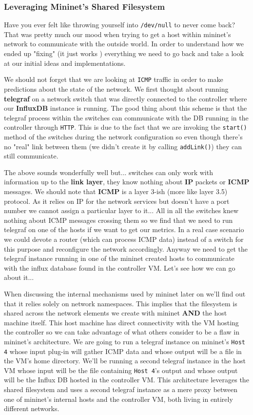 \documentclass[12pt]{report}
\newcommand{\newpar} {
    \vskip 1cm
}
\begin{document}
			\subsubsection{Leveraging Mininet's Shared Filesystem}
				Have you ever felt like throwing yourself into \texttt{/dev/null} to never come back? That was pretty much our mood when trying to get a host within mininet's network to communicate with the outside world. In order to understand how we ended up "fixing" (it just works  ) everything we need to go back and take a look at our initial ideas and implementations.
				\newpar
				We should not forget that we are looking at \texttt{ICMP} traffic in order to make predictions about the state of the network. We first thought about running \textbf{telegraf} on a network switch that was directly connected to the controller where our \textbf{InfluxDB} instance is running. The good thing about this scheme is that the telegraf process within the switches can communicate with the DB running in the controller through \texttt{HTTP}. This is due to the fact that we are invoking the \texttt{start()} method of the switches during the network configuration so even though there's no "real" link between them (we didn't create it by calling \texttt{addLink()}) they can still communicate.
				\newpar
				The above sounds wonderfully well but... switches can only work with information up to the \textbf{link layer}, they know nothing about \textbf{IP} packets or \textbf{ICMP} messages. We should note that \textbf{ICMP} is a layer 3-ish (more like layer 3.5) protocol. As it relies on IP for the network services but doesn't have a port number we cannot assign a particular layer to it... All in all the switches knew nothing about ICMP messages crossing them so we find that we need to run telegraf on one of the hosts if we want to get our metrics. In a real case scenario we could devote a router (which can process ICMP data) instead of a switch for this purpose and reconfigure the network accordingly. Anyway we need to get the telegraf instance running in one of the mininet created hosts to communicate with the influx database found in the controller VM. Let's see how we can go about it...
				\newpar
				When discussing the internal mechanisms used by mininet later on we'll find out that it relies solely on network namespaces. This implies that the filesystem is shared across the network elements we create with mininet \textbf{AND} the host machine itself. This host machine has direct connectivity with the VM hosting the controller so we can take advantage of what others consider to be a flaw in mininet's architecture. We are going to run a telegraf instance on mininet's \texttt{Host 4} whose input plug-in will gather ICMP data and whose output will be a file in the VM's home directory. We'll be running a second telegraf instance in the host VM whose input will be the file containing \texttt{Host 4}'s output and whose output will be the Influx DB hosted in the controller VM. This architecture leverages the shared filesystem and uses a second telegraf instance as a mere proxy between one of mininet's internal hosts and the controller VM, both living in entirely different networks.
\end{document}
